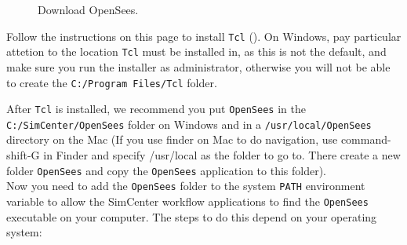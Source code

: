 \begin{figure}[!htbp]
  \caption{Download OpenSees.}
  \label{fig:openseesDownload}
\end{figure}

Follow the instructions on this page to install \texttt{Tcl}
(). On Windows, pay particular
attetion to the location \texttt{Tcl} must be installed in, as this is not the
default, and make sure you run the installer as administrator,
otherwise you will not be able to create the \texttt{C:/Program
Files/Tcl} folder.

After \texttt{Tcl} is installed, we recommend you put \texttt{OpenSees} in
the \texttt{C:/SimCenter/OpenSees} folder on Windows and in
a \texttt{/usr/local/OpenSees} directory on the Mac (If you use finder
on Mac to do navigation, use command-shift-G in Finder and specify
/usr/local as the folder to go to. There create a new folder \texttt{OpenSees}
and copy the \texttt{OpenSees} application to this folder).\\


Now you need to add the \texttt{OpenSees} folder to the
system \texttt{PATH} environment variable to allow the SimCenter
workflow applications to find the \texttt{OpenSees} executable on your
computer. The steps to do this depend on your operating system:

